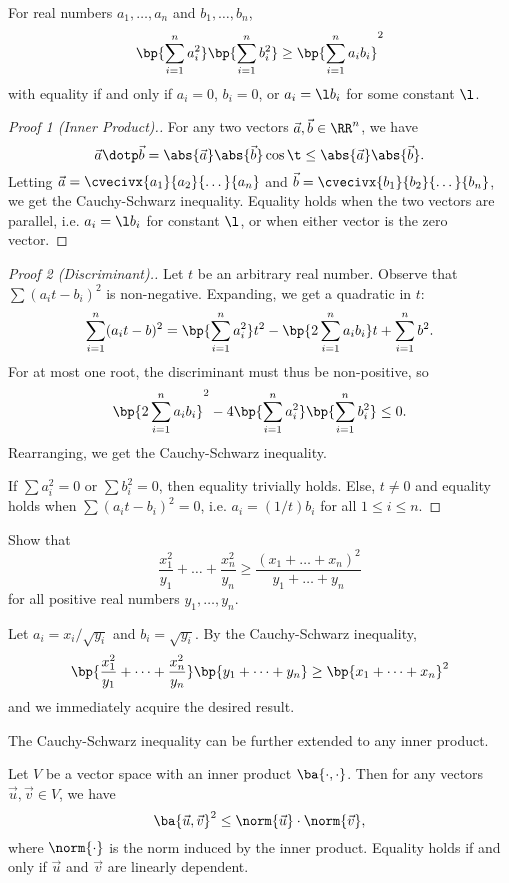 \begin{theorem}
    For real numbers $a_1, \dots, a_n$ and $b_1, \dots, b_n$, \[\bp{\sum_{i = 1}^n a_i^2} \bp{\sum_{i = 1}^n b_i^2} \geq \bp{\sum_{i =1}^n a_i b_i}^2\] with equality if and only if $a_i = 0$, $b_i = 0$, or $a_i = \l b_i$ for some constant $\l$.
\end{theorem}
\begin{proof}[Proof 1 (Inner Product).]
    For any two vectors $\vec a, \vec b \in \RR^n$, we have \[\vec a \dotp \vec b = \abs{\vec a} \abs{\vec b} \cos \t \leq \abs{\vec a} \abs{\vec b}.\] Letting $\vec a = \cvecivx{a_1}{a_2}{\dots}{a_n}$ and $\vec b = \cvecivx{b_1}{b_2}{\dots}{b_n}$, we get the Cauchy-Schwarz inequality. Equality holds when the two vectors are parallel, i.e. $a_i = \l b_i$ for constant $\l$, or when either vector is the zero vector.
\end{proof}
\begin{proof}[Proof 2 (Discriminant).]
    Let $t$ be an arbitrary real number. Observe that $\sum (a_i t - b_i)^2$ is non-negative. Expanding, we get a quadratic in $t$: \[\sum_{i = 1}^n (a_i t - b)^2 = \bp{\sum_{i = 1}^n a_i^2} t^2 - \bp{2\sum_{i = 1}^n a_i b_i} t + \sum_{i = 1}^n b^2.\] For at most one root, the discriminant must thus be non-positive, so \[\bp{2\sum_{i = 1}^n a_i b_i}^2 - 4\bp{\sum_{i = 1}^n a_i^2}\bp{\sum_{i = 1}^n b_i^2} \leq 0.\] Rearranging, we get the Cauchy-Schwarz inequality.
    
    If $\sum a_i^2 = 0$ or $\sum b_i^2 = 0$, then equality trivially holds. Else, $t \neq 0$ and equality holds when $\sum (a_i t - b_i)^2 = 0$, i.e. $a_i = (1/t) b_i$ for all $1 \leq i \leq n$.
\end{proof}

\begin{sample}
    Show that \[\frac{x_1^2}{y_1} + \dots + \frac{x_n^2}{y_n} \geq \frac{(x_1 + \dots + x_n)^2}{y_1 + \dots + y_n}\] for all positive real numbers $y_1, \dots, y_n$.
\end{sample}
\begin{sampans}
    Let $a_i = x_i/\sqrt{y_i}$ and $b_i = \sqrt{y_i}$. By the Cauchy-Schwarz inequality, \[\bp{\frac{x_1^2}{y_1} + \dots + \frac{x_n^2}{y_n}}\bp{y_1 + \dots + y_n} \geq \bp{x_1 + \dots + x_n}^2\] and we immediately acquire the desired result.
\end{sampans}

The Cauchy-Schwarz inequality can be further extended to any inner product.

\begin{theorem}
    Let $V$ be a vector space with an inner product $\ba{\cdot, \cdot}$. Then for any vectors $\vec u, \vec v \in V$, we have \[\ba{\vec u, \vec v}^2 \leq \norm{\vec u} \cdot \norm{\vec v},\] where $\norm{\cdot}$ is the norm induced by the inner product. Equality holds if and only if $\vec u$ and $\vec v$ are linearly dependent.
\end{theorem}

